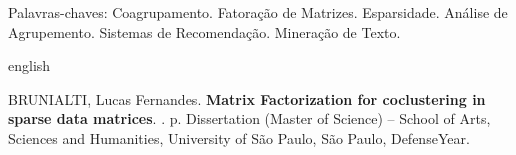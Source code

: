\documentclass[
    12pt,                %
    oneside,            %
    a4paper,            %
    english,            %
    brazil                %
    ]{abntex2ppgsi}
\begin{document}
\begin{resumo}
Palavras-chaves: Coagrupamento. Fatoração de Matrizes. Esparsidade. Análise de Agrupemento. Sistemas de Recomendação. Mineração de Texto.
\end{resumo}

%
%
\begin{resumo}[Abstract]
\begin{otherlanguage*}{english}

%
%
%
%
\begin{flushleft}
BRUNIALTI, Lucas Fernandes. \textbf{Matrix Factorization for coclustering in sparse data matrices}. \imprimirdata. \pageref{LastPage} p. Dissertation (Master of Science) – School of Arts, Sciences and Humanities, University of São Paulo, São Paulo, DefenseYear.
\end{flushleft}


\end{otherlanguage*}
\end{resumo}
\end{document}
